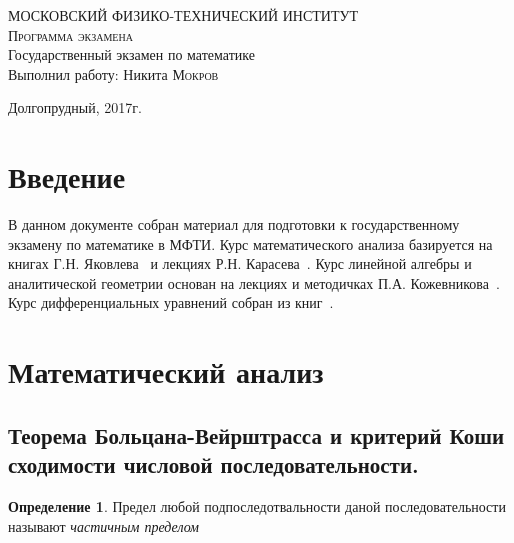 \documentclass{urticle}
\theoremstyle{definition}
\newtheorem{definition}{Определение}
\begin{document}
\begin{titlepage}

    \begin{center}
        \large МОСКОВСКИЙ ФИЗИКО-ТЕХНИЧЕСКИЙ ИНСТИТУТ
        \vspace{2cm}\\
        \textsc{Программа экзамена}
        \vspace{8cm}\\
        \LARGE Государственный экзамен по математике
        \vspace{3cm}\\
        \large Выполнил работу: Никита \textsc{Мокров}
    \end{center}

    \vfill
    \center Долгопрудный, 2017г.
\end{titlepage}

\tableofcontents
\newpage

\section*{Введение}
\label{Intro}
    В данном документе собран материал для подготовки к государственному экзамену по математике в МФТИ. Курс математического анализа базируется на книгах Г.Н. Яковлева~\cite{Yakovlev} и лекциях Р.Н. Карасева~\cite{Karasev}. Курс линейной алгебры и аналитической геометрии основан на лекциях и методичках П.А. Кожевникова~\cite{Kozhevnikov}. Курс дифференциальных уравнений собран из книг~\cite{Diff1}.

\section{Математический анализ}
\label{MathAnalysis}

\subsection{Теорема Больцана-Вейрштрасса и критерий Коши сходимости числовой последовательности.}
    
    \begin{definition}
    \label{def:PartialLimit}
        Предел любой подпоследотвальности даной последовательности называют \textit{частичным пределом}
    \end{definition}    
    
\end{document}
